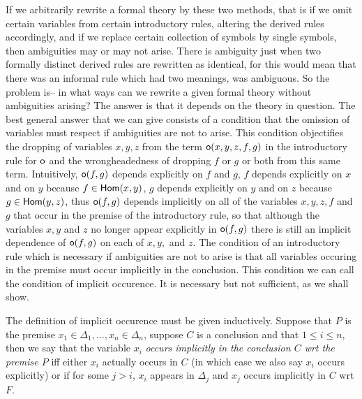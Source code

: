 If we arbitrarily rewrite a formal theory by these two methods, that is if we omit certain variables from certain introductory rules, altering the derived rules accordingly, and if we replace certain collection of symbols by single symbols, then ambiguities may or may not arise.
%
There is ambiguity just when two formally distinct derived rules are rewritten as identical, for this would mean that there was an informal rule which had two meanings, was ambiguous.
%
So the problem is-- in what ways can we rewrite a given formal theory without ambiguities arising?
%
The answer is that it depends on the theory in question.
%
The best general answer that we can give consists of a condition that the omission of variables must respect if ambiguities are not to arise. This condition objectifies the dropping of variables $x,y,z$ from the term $\mathsf{o}(x,y,z,f,g)$ in the introductory rule for $\mathsf{o}$ and the wrongheadedness of dropping $f$ or $g$ or both from this same term.
%
Intuitively, $\mathsf{o}(f,g)$ depends explicitly on $f$ and $g$, $f$ depends explicitly on $x$ and on $y$ because $f\in\mathsf{Hom}(x,y)$, $g$ depends explicitly on $y$ and on $z$ because $g\in\mathsf{Hom}(y,z)$, thus $\mathsf{o}(f,g)$ depends implicitly on all of the variables $x,y,z,f$ and $g$ that occur in the premise of the introductory rule, so that although the variables $x,y$ and $z$ no longer appear explicitly in $\mathsf{o}(f,g)$ there is still an implicit dependence of $\mathsf{o}(f,g)$ on each of $x,y,$ and $z$.
%
The condition of an introductory rule which is necessary if ambiguities are not to arise is that all variables occuring in the premise must occur implicitly in the conclusion.
%
This condition we can call the condition of implicit occurence.
%
It is necessary but not sufficient, as we shall show.


The definition of implicit occurence must be given inductively.
%
Suppose that $P$ is the premise $x_1\in\Delta_1,\ldots,x_n\in\Delta_n$, suppose $C$ is a conclusion and that $1\leq i\leq n$, then we say that the variable $x_i$ \emph{occurs implicitly in the conclusion $C$ wrt the premise $P$} iff either $x_i$ actually occurs in $C$ (in which case we also say $x_i$ occurs explicitly) or if for some $j>i$, $x_i$ appears in $\Delta_j$ and $x_j$ occurs implicitly in $C$ wrt $F$.


